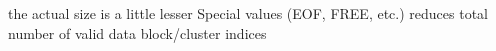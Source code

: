 \documentclass[8pt,twocolumn]{article}
\begin{document}
\noindent{}
the actual size is a little lesser
Special values (EOF, FREE, etc.) reduces total number of valid data block/cluster indices
\noindent{}
\vspace{-0.6em}
\end{document}
